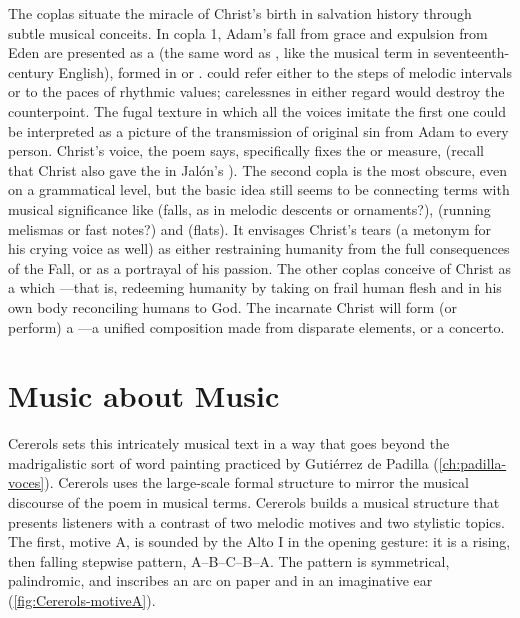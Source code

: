 The coplas situate the miracle of Christ's birth in salvation history through
subtle musical conceits.
In copla 1, Adam's fall from grace and expulsion from Eden are presented as a
 (the same word as , like the musical term
 in seventeenth-century English), formed in 
or . 
 could refer either to the steps of melodic intervals or to the
paces of rhythmic values; carelessnes in either regard would destroy the
counterpoint.
The fugal texture in which all the voices imitate the first one could be
interpreted as a picture of the transmission of original sin from Adam to every
person.
Christ's voice, the poem says, specifically fixes the  or measure,
 (recall that Christ also gave the
 in Jalón's ).
The second copla is the most obscure, even on a grammatical level, but the basic
idea still seems to be connecting terms with musical significance like
 (falls, as in melodic descents or ornaments?), 
(running melismas or fast notes?) and  (flats).
It envisages Christ's tears (a metonym for his crying voice as well) as either
restraining humanity from the full consequences of the Fall, or as a portrayal
of his passion.
The other coplas conceive of Christ as a  which
---that is, redeeming
humanity by taking on frail human flesh and in his own body reconciling humans
to God.%
The incarnate Christ will form (or perform) a ---a unified
composition made from disparate elements, or a concerto.

\section{Music about Music}

Cererols sets this intricately musical text in a way that goes beyond the
madrigalistic sort of word painting practiced by Gutiérrez de Padilla
(\cref{ch:padilla-voces}).
Cererols uses the large-scale formal structure to mirror the musical discourse
of the poem in musical terms.
Cererols builds a musical structure that presents listeners with a contrast of
two melodic motives and two stylistic topics.
The first, motive A, is sounded by the Alto I in the opening gesture: it is a
rising, then falling stepwise pattern, A--B--C--B--A.
The pattern is symmetrical, palindromic, and inscribes an arc on paper and in an
imaginative ear (\cref{fig:Cererols-motiveA}).

